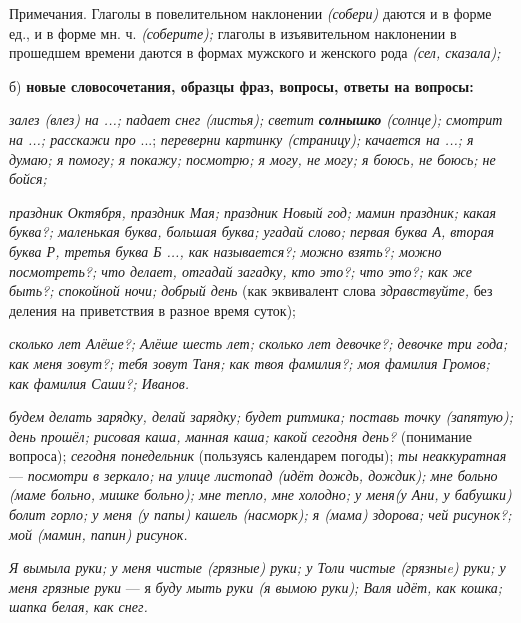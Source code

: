 \documentclass{book}
\renewcommand{\emph}[1]{\textit{#1}}
\begin{document}
Примечания. Глаголы в повелительном наклонении \emph{(собери)} даются и
в форме ед., и в форме мн. ч. \emph{(соберите);} глаголы в изъявительном
наклонении в прошедшем времени даются в формах мужского и женского рода
\emph{(сел, сказала);}

б) \textbf{новые словосочетания, образцы фраз, вопросы, ответы на
вопросы:}

\emph{залез (влез) на ...; падает снег (листья); светит
\textbf{солнышко} (солнце); смотрит на ...; расскажи про} ...;
\emph{переверни картинку (страницу); качается на ...; я думаю; я помогу;
я покажу; посмотрю; я могу, не могу; я боюсь, не боюсь; не бойся;}

\emph{праздник Октября, праздник Мая; праздник Новый год; мамин
праздник; какая буква?; маленькая буква, большая буква; угадай слово;
первая буква А, вторая буква Р, третья буква Б ..., как называется?;
можно взять?; можно посмотреть?; что делает, отгадай загадку, кто это?;
что это?; как же быть?; спокойной ночи; добрый день} (как эквивалент
слова \emph{здравствуйте,} без деления на приветствия в разное время
суток);

\emph{сколько лет Алёше?; Алёше шесть лет; сколько лет девочке?; девочке
три года; как меня зовут?; тебя зовут Таня; как твоя фамилия?; моя
фамилия Громов; как фамилия Саши?; Иванов.}

\emph{будем делать зарядку, делай зарядку; будет ритмика; поставь точку
(запятую); день прошёл; рисовая каша, манная каша; какой сегодня день?}
(понимание вопроса); \emph{сегодня понедельник} (пользуясь календарем
погоды); \emph{ты неаккуратная} --- \emph{посмотри в зеркало; на улице
листопад (идёт дождь, дождик); мне больно (маме больно, мишке больно);
мне тепло, мне холодно; у меня(у Ани, у бабушки) болит горло; у меня (у
папы) кашель (насморк); я (мама) здорова; чей рисунок?; мой (мамин,
папин) рисунок.}

\emph{Я вымыла руки; у меня чистые (грязные) руки; у Толи чистые
(грязныe) руки; у меня грязные руки} --- я \emph{буду мыть руки (я вымою
руки); Валя идёт, как кошка; шапка белая, как снег.}
\end{document}
